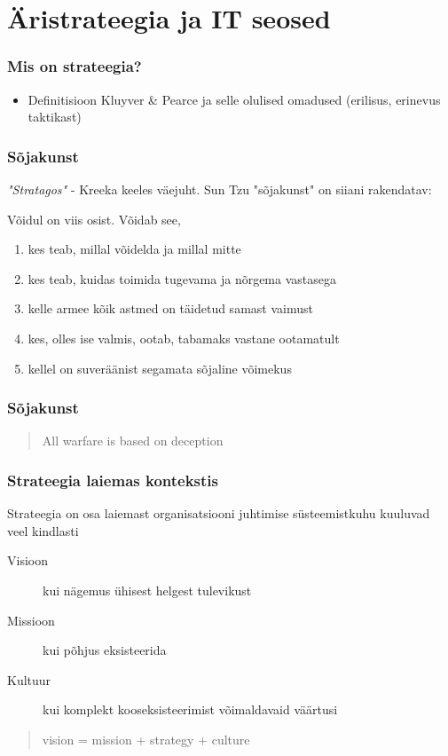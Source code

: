 \section{Äristrateegia ja IT seosed}
\begin{frame}[fragile]
  \frametitle{Mis on strateegia?}
	\begin{itemize}
		\item Definitisioon Kluyver \& Pearce ja selle olulised omadused (erilisus, erinevus taktikast)
	\end{itemize}
\end{frame}

\begin{frame}[fragile]
  \frametitle{Sõjakunst}
  \emph{"Stratagos"} - Kreeka keeles väejuht. Sun Tzu "sõjakunst" \citep{tzu2013art} on siiani rakendatav:
  
  Võidul on viis osist. Võidab see, 
   \begin{enumerate}
   		\item kes teab, millal võidelda ja millal mitte
		\item kes teab, kuidas toimida tugevama ja nõrgema vastasega
		\item kelle armee kõik astmed on täidetud samast vaimust
		\item kes, olles ise valmis, ootab, tabamaks vastane ootamatult
		\item kellel on suveräänist segamata sõjaline võimekus
   \end{enumerate}
\end{frame}

\begin{frame}[fragile]
  \frametitle{Sõjakunst}
  \begin{quote}
    All warfare is based on deception
  \end{quote}

\end{frame}

\begin{frame}[fragile]
  \frametitle{Strateegia laiemas kontekstis}
  Strateegia on osa laiemast organisatsiooni juhtimise süsteemistkuhu kuuluvad veel kindlasti 
  	\begin{description}
		\item[Visioon] kui nägemus ühisest helgest tulevikust
		\item[Missioon] kui põhjus eksisteerida
		\item[Kultuur] kui komplekt kooseksisteerimist võimaldavaid väärtusi
	\end{description}	
	\begin{quote}
	vision = mission + strategy + culture \end{quote}\citep{lipton1996demystifying}
\end{frame}


